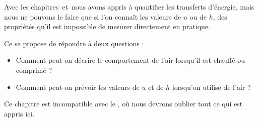 Avec les chapitres~\deux et~\trois nous avons appris à quantifier les transferts d’énergie, mais nous ne pouvons le faire que si l’on connaît les valeurs de $u$ ou de $h$, des propriétés qu’il est impossible de mesurer directement en pratique.
	
Ce \coursquatre se propose de répondre à deux questions :
\begin{itemize}
	\item Comment peut-on décrire le comportement de l’air lorsqu’il est chauffé ou comprimé ?
	\item Comment peut-on prévoir les valeurs de $u$ et de $h$ lorsqu’on utilise de l’air ?
\end{itemize}
Ce chapitre est incompatible avec le \courscinq, où nous devrons oublier tout ce qui est appris ici.
